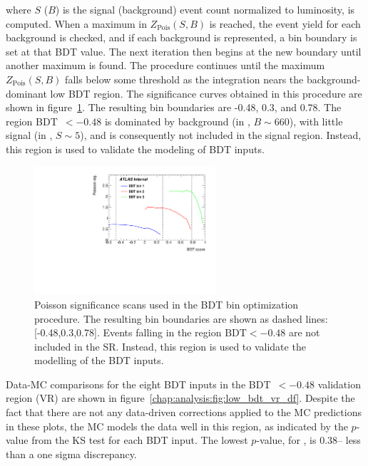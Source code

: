 \noindent
where $S$ ($B$) is the signal (background) event count normalized to
luminosity, is computed. When a maximum in $Z_{\textrm{Pois}}(S,B)$ is
reached, the event yield for each background is checked, and if each
background is represented, a bin boundary is set at that BDT
value. The next iteration then begins at the new boundary until another
maximum is found. The procedure continues until the maximum
$Z_{\textrm{Pois}}(S,B)$ falls below some threshold as the integration
nears the background-dominant low BDT region. The significance curves
obtained in this procedure are shown in
figure~\ref{chap:analysis:fig:bin_opt}. The resulting bin boundaries
are -0.48, 0.3, and 0.78. The region BDT~$<-0.48$ is dominated by
background (in \emme, $B \sim 660$), with little signal (in \emme, $S \sim 5$),
and is consequently not included in the signal region. Instead, this
region is used to validate the modeling of BDT inputs. 

\begin{figure}[h]
  \centering
  \includegraphics[width=0.6\textwidth]{fig/analysis/bin_opt_plot.pdf}
  \caption{Poisson significance scans used in the BDT bin optimization
  procedure. The resulting bin boundaries are shown as dashed lines:
  [-0.48,0.3,0.78]. Events falling in the region
  $\textrm{BDT} < -0.48$ are not included in the SR. Instead, this
  region is used to validate the modelling of the BDT inputs.}
  \label{chap:analysis:fig:bin_opt}
\end{figure}

Data-MC comparisons for the eight BDT inputs in the BDT~$<-0.48$
validation region (VR) are shown in
figure~\ref{chap:analysis:fig:low_bdt_vr_df}. Despite the fact that
there are not any data-driven corrections applied to the MC
predictions in these plots, the MC models the data well in this
region, as indicated by the $p$-value from the KS test for each BDT
input. The lowest $p$-value, for \lepEtaCent, is 0.38-- less than a
one sigma discrepancy. 

